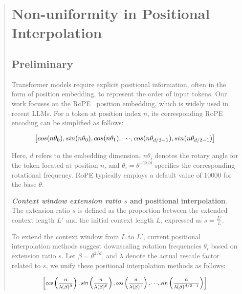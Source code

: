 \begin{abstract}
\section{Non-uniformity in Positional Interpolation}
\label{sec:analysis}

\subsection{Preliminary}

Transformer models require explicit positional information, often in the form of position embedding, to represent the order of input tokens. Our work focuses on the RoPE~\cite{rope} position embedding, which is widely used in recent  LLMs. For a token at position index $n$, its corresponding RoPE encoding can be simplified as follows:

\begin{equation}
		\fontsize{7.8}{7.8} \selectfont
	\label{eq:rope}
	\left[ cos(n\theta_0), sin(n\theta_0), cos(n\theta_1), \cdot\cdot\cdot, cos(n\theta_{d/2-1}), sin(n\theta_{d/2-1}) \right]   
\end{equation}

Here, $d$ refers to the embedding dimension, $n\theta_i$ denotes the rotary angle for the token located at position $n$, and $\theta_i=\theta^{-2i/d}$ specifies the corresponding rotational frequency. RoPE typically employs a default value of 10000 for the base $\theta$.

\textbf{\emph{Context window extension ratio $s$} and positional interpolation}. The extension ratio $s$ is defined as the proportion between the extended context length $L'$ and the initial context length $L$, expressed as $s=\frac{L'}{L}$.

To extend the context window from $L$ to $L'$, current positional interpolation methods suggest downscaling rotation frequencies $\theta_i$ based on extension ratio $s$. Let $\beta=\theta^{2/d}$, and $\lambda$ denote the actual rescale factor related to $s$, we   unify these positional interpolation methods as follows:

\begin{equation}	
	\fontsize{7.5}{7.5} \selectfont
	\label{eq:unified_rope}
	\begin{aligned}
		\left[cos\left(\frac{n}{\lambda(\beta)^0}\right), sin \left(\frac{n}{\lambda(\beta)^0}\right), cos\left(\frac{n}{\lambda(\beta)^1}\right), \cdot\cdot\cdot,  sin \left(\frac{n}{\lambda(\beta)^{d/2-1}}\right) \right]   
	\end{aligned}
\end{equation}


\end{abstract}
